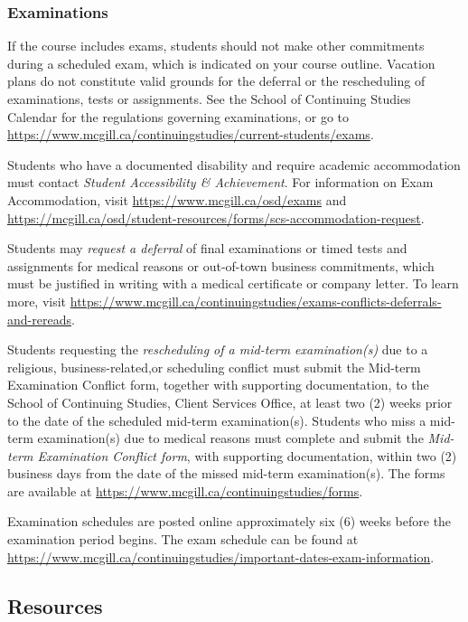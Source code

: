 \documentclass{article}
\begin{document}
\subsubsection{Examinations}

If the course includes exams, students should not make other
commitments during a scheduled exam, which is indicated on your course
outline. Vacation plans do not constitute valid grounds for the
deferral or the rescheduling of examinations, tests or
assignments. See the School of Continuing Studies Calendar for the
regulations governing examinations, or go to
\url{https://www.mcgill.ca/continuingstudies/current-students/exams}.

Students who have a documented disability and require academic
accommodation must contact {\em Student Accessibility \&
  Achievement}. For information on Exam Accommodation, visit
\url{https://www.mcgill.ca/osd/exams} and
\url{https://mcgill.ca/osd/student-resources/forms/scs-accommodation-request}.


Students may {\em request a deferral} of final examinations or timed
tests and assignments for medical reasons or out-of-town business
commitments, which must be justified in writing with a medical
certificate or company letter. To learn more, visit
\url{https://www.mcgill.ca/continuingstudies/exams-conflicts-deferrals-and-rereads}.


Students requesting the {\em rescheduling of a mid-term
  examination(s)} due to a religious, business-related,or scheduling
conflict must submit the Mid-term Examination Conflict form, together
with supporting documentation, to the School of Continuing Studies,
Client Services Office, at least two (2) weeks prior to the date of
the scheduled mid-term examination(s). Students who miss a mid-term
examination(s) due to medical reasons must complete and submit the
{\em Mid-term Examination Conflict form}, with supporting documentation,
within two (2) business days from the date of the missed
mid-term examination(s). The forms are available at
\url{https://www.mcgill.ca/continuingstudies/forms}.

Examination schedules are posted online approximately six (6) weeks
before the examination period begins. The exam schedule can be found
at
\url{https://www.mcgill.ca/continuingstudies/important-dates-exam-information}.

\newpage

\subsection{Resources }
\end{document}
